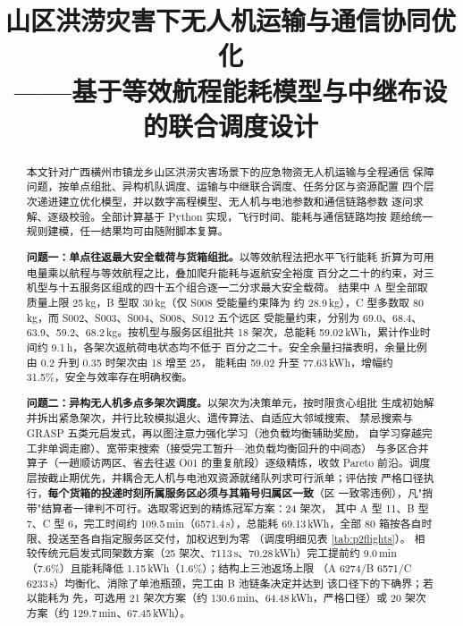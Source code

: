 \documentclass[bwprint]{gmcmthesis}
\title{山区洪涝灾害下无人机运输与通信协同优化\\ ——基于等效航程能耗模型与中继布设的联合调度设计}
\begin{document}
\maketitle

\begin{abstract}

本文针对广西横州市镇龙乡山区洪涝灾害场景下的应急物资无人机运输与全程通信
保障问题，按单点组批、异构机队调度、运输与中继联合调度、任务分区与资源配置
四个层次递进建立优化模型，并以数字高程模型、无人机与电池参数和通信链路参数
逐问求解、逐级校验。全部计算基于 Python 实现，飞行时间、能耗与通信链路均按
题给统一规则建模，任一结果均可由随附脚本复算。

\textbf{问题一：单点往返最大安全载荷与货箱组批。}以等效航程法把水平飞行能耗
折算为可用电量乘以航程与等效航程之比，叠加爬升能耗与返航安全裕度
百分之二十的约束，对三机型与十五服务区组成的四十五个组合逐一二分求最大安全载荷。
结果中 A 型全部取质量上限 25\,kg，B 型取 30\,kg（仅 S008 受能量约束降为
约 28.9\,kg），C 型多数取 80\,kg，而 S002、S003、S004、S008、S012 五个远区
受能量约束，分别为 69.0、68.4、63.9、59.2、68.2\,kg。按机型与服务区组批共
18 架次，总能耗 59.02\,kWh，累计作业时间约 9.1\,h，各架次返航荷电状态均不低于
百分之二十。安全余量扫描表明，余量比例由 0.2 升到 0.35 时架次由 18 增至 25，
能耗由 59.02 升至 77.63\,kWh，增幅约 31.5\%，安全与效率存在明确权衡。

\textbf{问题二：异构无人机多点多架次调度。}以架次为决策单元，按时限贪心组批
生成初始解并拆出紧急架次，并行比较模拟退火、遗传算法、自适应大邻域搜索、
禁忌搜索与 GRASP 五类元启发式，再以图注意力强化学习（池负载均衡辅助奖励，
自学习穿越完工非单调走廊）、宽带束搜索（接受完工暂升—池负载均衡回升的中间态）
与多区合并算子（一趟顺访两区、省去往返 O01 的重复航段）逐级精炼，收敛 Pareto
前沿。调度层按截止期优先，并耦合无人机与电池双资源就绪队列求可行派单；评估按
严格口径执行，\textbf{每个货箱的投递时刻所属服务区必须与其箱号归属区一致}（区
一致零违例），凡"捎带"结算者一律判不可行。选取零迟到的精炼冠军方案：24 架次，
其中 A 型 11、B 型 7、C 型 6，完工时间约 109.5\,min（6571.4\,s），总能耗
69.13\,kWh，全部 80 箱按各自时限、投送至各自指定服务区交付，加权迟到为零
（调度明细见表 \ref{tab:p2flights}）。
相较传统元启发式同架数方案（25 架次、7113\,s、70.28\,kWh）完工提前约
9.0\,min（7.6\%）且能耗降低 1.15\,kWh（1.6\%）；结构上三池返场上限
（A 6274/B 6571/C 6233\,s）均衡化、消除了单池瓶颈，完工由 B 池链条决定并达到
该口径下的下确界；若以能耗为
先，可选用 21 架次方案（约 130.6\,min、64.48\,kWh，严格口径）或
20 架次方案（约 129.7\,min、67.45\,kWh）。


\end{abstract}
\end{document}
